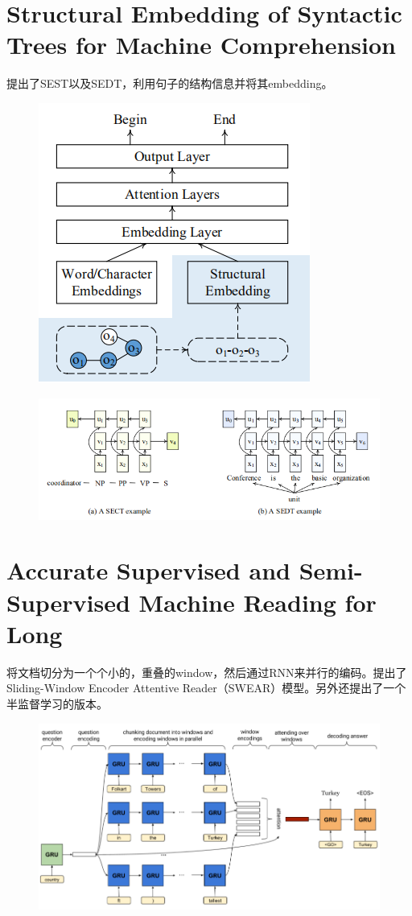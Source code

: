 \documentclass[a4paper,UTF8]{article}
\numberwithin{equation}{section}
\begin{document}
\section{Structural Embedding of Syntactic Trees for Machine Comprehension}
提出了SEST以及SEDT，利用句子的结构信息并将其embedding。
\begin{figure}[H]
	\centering
	\includegraphics[]{9-1.png}
\end{figure}
\begin{figure}[H]
	\centering
	\includegraphics[width=\textwidth]{9-2.png}
\end{figure}

\newpage
\section{Accurate Supervised and Semi-Supervised Machine Reading for Long}
将文档切分为一个个小的，重叠的window，然后通过RNN来并行的编码。提出了Sliding-Window Encoder Attentive Reader（SWEAR）模型。另外还提出了一个半监督学习的版本。
\begin{figure}[H]
	\centering
	\includegraphics[width=\textwidth]{10-1.png}
\end{figure}
\end{document}
